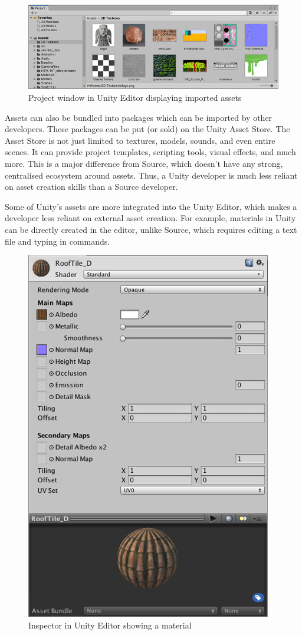 \documentclass[a4paper, 12pt]{scrartcl}
\begin{document}
\begin{figure}[!ht]
  \centering
  \includegraphics[width=0.75\linewidth]{images/unity_project_window.png}
  \caption{Project window in Unity Editor displaying imported assets}
  \label{fig:unity_project_window}
\end{figure}

Assets can also be bundled into packages which can be imported by other developers. These packages can be put (or sold) on the Unity Asset Store. The Asset Store is not just limited to textures, models, sounds, and even entire scenes. It can provide project templates, scripting tools, visual effects, and much more. This is a major difference from Source, which doesn't have any strong, centralised ecosystem around assets. Thus, a Unity developer is much less reliant on asset creation skills than a Source developer.

Some of Unity's assets are more integrated into the Unity Editor, which makes a developer less reliant on external asset creation. For example, materials in Unity can be directly created in the editor, unlike Source, which requires editing a text file and typing in commands.

\begin{figure}[!ht]
  \centering
  \includegraphics[scale=0.75]{images/unity_material.png}
  \caption{Inspector in Unity Editor showing a material}
  \label{fig:unity_material}
\end{figure}
\end{document}
